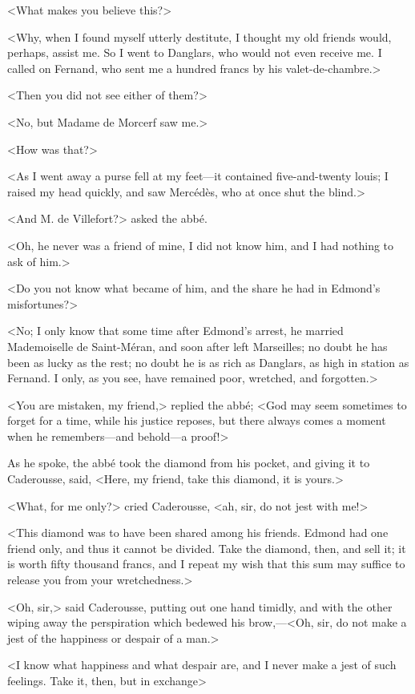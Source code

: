  <What makes you believe this?> 

 <Why, when I found myself utterly destitute, I thought my old friends would, perhaps, assist me. So I went to Danglars, who would not even receive me. I called on Fernand, who sent me a hundred francs by his valet-de-chambre.> 

 <Then you did not see either of them?> 

 <No, but Madame de Morcerf saw me.> 

 <How was that?> 

 <As I went away a purse fell at my feet—it contained five-and-twenty louis; I raised my head quickly, and saw Mercédès, who at once shut the blind.> 

 <And M. de Villefort?> asked the abbé. 

 <Oh, he never was a friend of mine, I did not know him, and I had nothing to ask of him.> 

 <Do you not know what became of him, and the share he had in Edmond's misfortunes?> 

 <No; I only know that some time after Edmond's arrest, he married Mademoiselle de Saint-Méran, and soon after left Marseilles; no doubt he has been as lucky as the rest; no doubt he is as rich as Danglars, as high in station as Fernand. I only, as you see, have remained poor, wretched, and forgotten.> 

 <You are mistaken, my friend,> replied the abbé; <God may seem sometimes to forget for a time, while his justice reposes, but there always comes a moment when he remembers—and behold—a proof!> 

 As he spoke, the abbé took the diamond from his pocket, and giving it to Caderousse, said, <Here, my friend, take this diamond, it is yours.> 

 <What, for me only?> cried Caderousse, <ah, sir, do not jest with me!> 

 <This diamond was to have been shared among his friends. Edmond had one friend only, and thus it cannot be divided. Take the diamond, then, and sell it; it is worth fifty thousand francs, and I repeat my wish that this sum may suffice to release you from your wretchedness.>

<Oh, sir,> said Caderousse, putting out one hand timidly, and with the other wiping away the perspiration which bedewed his brow,—<Oh, sir, do not make a jest of the happiness or despair of a man.> 

 <I know what happiness and what despair are, and I never make a jest of such feelings. Take it, then, but in exchange\longdash> 

